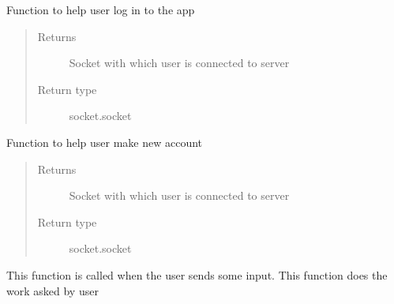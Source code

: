 \documentclass[letterpaper,10pt,english]{sphinxmanual}
\begin{document}
\begin{fulllineitems}
\label{\detokenize{app:app.login}}
Function to help user log in to the app
\begin{quote}\begin{description}
\item[{Returns}] \leavevmode
Socket with which user is connected to server

\item[{Return type}] \leavevmode
socket.socket

\end{description}\end{quote}

\end{fulllineitems}


\begin{fulllineitems}
\label{\detokenize{app:app.signup}}
Function to help user make new account
\begin{quote}\begin{description}
\item[{Returns}] \leavevmode
Socket with which user is connected to server

\item[{Return type}] \leavevmode
socket.socket

\end{description}\end{quote}

\end{fulllineitems}


\begin{fulllineitems}
\label{\detokenize{app:app.handleUserInput}}
This function is called when the user sends some input. This function does the work asked by user

\end{fulllineitems}
\end{document}
